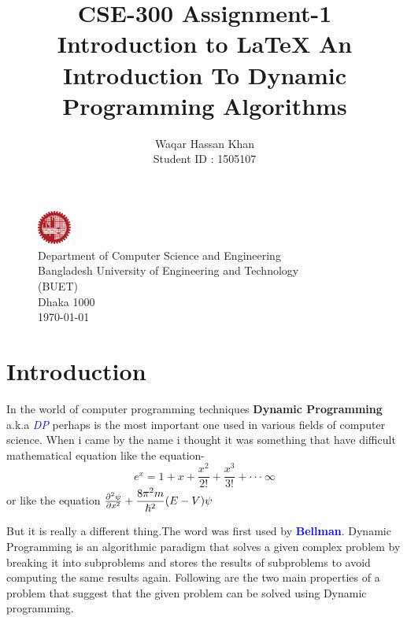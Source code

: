 \documentclass[12pt]{article}
\title{
	\Large{CSE-300 Assignment-1}
	\endgraf
	\Large{Introduction to \LaTeX}
	\endgraf\bigskip	
	\textbf{An Introduction To Dynamic Programming Algorithms}
	\endgraf\bigskip
}
\author{
	\Large{Waqar Hassan Khan}\\
	\Large{Student ID : 1505107}
}
\date{}
\begin{document}
\maketitle

\section*{}
\begin{figure}[b]
	\centering
	
	\captionsetup{justification=centering}
	\includegraphics[width = 0.1\textwidth]{image/buet.png}
	\caption*{
		\Large{Department of Computer Science and Engineering}
		\\
		\Large{Bangladesh University of Engineering and Technology}
		\\
		\Large{(BUET)}
		\\
		\Large{Dhaka 1000}
		\\
		\Large{\today}
	}
	
\end{figure}

\newpage
\tableofcontents
\newpage

\section{Introduction}
In the world of computer programming techniques \textbf{Dynamic Programming} a.k.a \textcolor{blue}{\textit{DP}} perhaps is the most important one used in various fields of computer science. When i came by the name i thought it was something that have difficult mathematical equation like the equation-
\begin{equation*}
e ^ x = 1 + x + \frac{x ^ 2}{ 2 !} + \frac{x ^ 3}{3!} + \cdot \cdot \cdot ~ \infty
\label{eqn:e}
\end{equation*}  
\newline
or like the equation $\pdv[2]{\psi}{x}+\dfrac{8\pi^2m}{\hslash^2}(E-V)\psi$
\newline

But it is really a different thing.The word was first used by \textcolor{blue}{\textbf{Bellman}}. Dynamic Programming is an algorithmic paradigm that solves a given complex problem by breaking it into subproblems and stores the results of subproblems to avoid computing the same results again. Following are the two main properties of a problem that suggest that the given problem can be solved using Dynamic programming.
\end{document}
